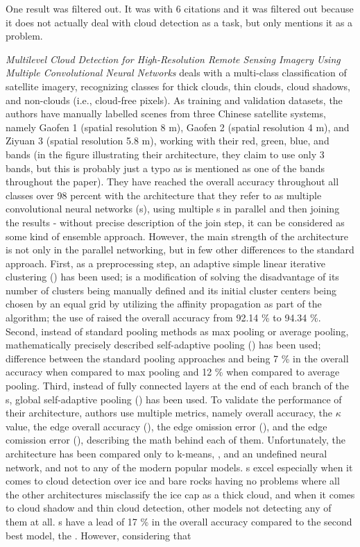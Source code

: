 One result was filtered out. It was \cite{center-pivot-remote-sensing} with 6 citations and it was filtered out because it does not actually deal with cloud detection as a task, but only mentions it as a problem.

\textit{Multilevel Cloud Detection for High-Resolution Remote Sensing Imagery Using Multiple Convolutional Neural Networks} deals with a multi-class classification of satellite imagery, recognizing classes for thick clouds, thin clouds, cloud shadows, and non-clouds (i.e., cloud-free pixels). As training and validation datasets, the authors have manually labelled scenes from three Chinese satellite systems, namely Gaofen 1 (spatial resolution 8 m), Gaofen 2 (spatial resolution 4 m), and Ziyuan 3 (spatial resolution 5.8 m), working with their red, green, blue, and  bands (in the figure illustrating their architecture, they claim to use only 3 bands, but this is probably just a typo as  is mentioned as one of the bands throughout the paper). They have reached the overall accuracy throughout all classes over 98 percent with the architecture that they refer to as multiple convolutional neural networks (s), using multiple s in parallel and then joining the results - without precise description of the join step, it can be considered as some kind of ensemble approach. However, the main strength of the architecture is not only in the parallel networking, but in few other differences to the standard approach. First, as a preprocessing step, an adaptive simple linear iterative clustering () has been used;  is a modification of  \cite{slic} solving the disadvantage of its number of clusters being manually defined and its initial cluster centers being chosen by an equal grid by utilizing the affinity propagation as part of the algorithm; the use of  raised the overall accuracy from 92.14 \% to 94.34 \%. Second, instead of standard pooling methods as max pooling or average pooling, mathematically precisely described self-adaptive pooling () has been used; difference between the standard pooling approaches and  being 7 \% in the overall accuracy when compared to max pooling and 12 \% when compared to average pooling. Third, instead of fully connected layers at the end of each branch of the s, global self-adaptive pooling () has been used. To validate the performance of their architecture, authors use multiple metrics, namely overall accuracy, the $\kappa$ value, the edge overall accuracy (), the edge omission error (), and the edge comission error (), describing the math behind each of them. Unfortunately, the architecture has been compared only to k-means,  \cite{svm}, and an undefined neural network, and not to any of the modern popular models. s excel especially when it comes to cloud detection over ice and bare rocks having no problems where all the other architectures misclassify the ice cap as a thick cloud, and when it comes to cloud shadow and thin cloud detection, other models not detecting any of them at all. s have a lead of 17 \% in the overall accuracy compared to the second best model, the  \cite{svm}. However, considering that  